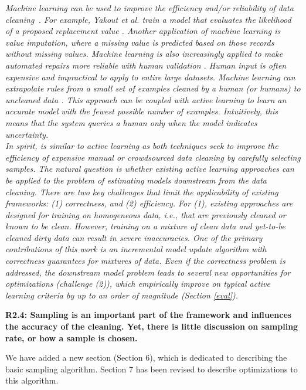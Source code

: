 \emph{Machine learning can be used to improve the efficiency and/or reliability of data cleaning~\cite{yakout2013don,gokhale2014corleone}.
For example, Yakout et al. train a model that evaluates the likelihood of a proposed replacement value \cite{yakout2013don}.
Another application of machine learning is value imputation, where a missing value is predicted based on those records without missing values.
Machine learning is also increasingly applied to make automated repairs more reliable with human validation \cite{DBLP:journals/pvldb/YakoutENOI11}.
Human input is often expensive and impractical to apply to entire large datasets.
Machine learning can extrapolate rules from a small set of examples cleaned by a human (or humans) to uncleaned data \cite{gokhale2014corleone, DBLP:journals/pvldb/YakoutENOI11}.
This approach can be coupled with active learning \cite{DBLP:journals/pvldb/MozafariSFJM14} to learn an accurate model with the fewest possible number of examples.
Intuitively, this means that the system queries a human only when the model indicates uncertainty.\\
In spirit, \sys is similar to active learning as both techniques seek to improve the efficiency of expensive manual or crowdsourced data cleaning by carefully selecting samples.
The natural question is whether existing active learning approaches can be applied to the problem of estimating models downstream from the data cleaning.
There are two key challenges that limit the applicability of existing frameworks: (1) correctness, and (2) efficiency. 
For (1), existing approaches are designed for training on homogeneous data, i.e., that are previously cleaned or known to be clean.
However, training on a mixture of clean data and yet-to-be cleaned dirty data can result in severe inaccuracies. 
One of the primary contributions of this work is an incremental model update algorithm with correctness guarantees for mixtures of data.
Even if the correctness problem is addressed, the downstream model problem leads to several new opportunities for optimizations (challenge (2)), which empirically improve on typical active learning criteria by up to an order of magnitude (Section \ref{eval}).}


\vspace{0.5em}

\textbf{R2.4: Sampling is an important part of the framework and influences the accuracy of the cleaning. Yet, there is little discussion on sampling rate, or how a sample is chosen.}

We have added a new section (Section 6), which is dedicated to describing the basic sampling algorithm.
Section 7 has been revised to describe optimizations to this algorithm.

